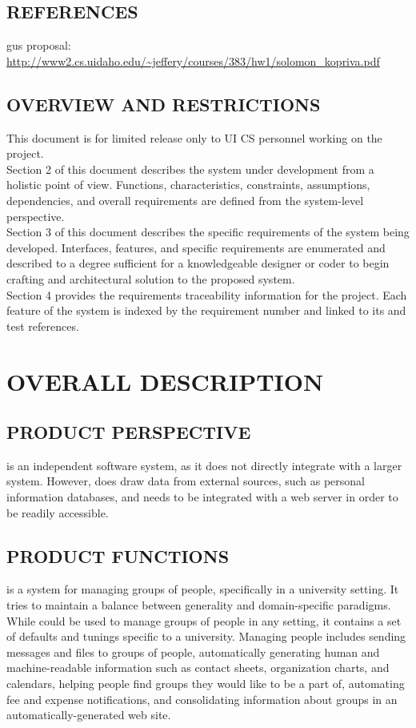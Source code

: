 \documentclass[12pt]{report}
\begin{document}
 \subsection{REFERENCES}
  gus proposal: {\small \url{http://www2.cs.uidaho.edu/~jeffery/courses/383/hw1/solomon_kopriva.pdf}}
 \newpage
 \subsection{OVERVIEW AND RESTRICTIONS}
  This document is for limited release only to UI CS personnel working on the project. \\[0.4cm]
  \indent Section 2 of this document describes the system under development from a holistic point of view. Functions, characteristics, constraints, assumptions, dependencies, and overall requirements are defined from the system-level perspective. \\[0.4cm]
  \indent Section 3 of this document describes the specific requirements of the system being developed. Interfaces, features, and specific requirements are enumerated and described to a degree sufficient for a knowledgeable designer or coder to begin crafting and architectural solution to the proposed system. \\[0.4cm]
  \indent Section 4 provides the requirements traceability information for the project. Each feature of the system is indexed by the  requirement number and linked to its  and test references.

\newpage
\section{OVERALL DESCRIPTION}
 \subsection{PRODUCT PERSPECTIVE}
   is an independent software system, as it does not directly integrate with a larger system. However,  does draw data from external sources, such as personal information databases, and needs to be integrated with a web server in order to be readily accessible.
 \subsection{PRODUCT FUNCTIONS}
   is a system for managing groups of people, specifically in a university setting. It tries to maintain a balance between generality and domain-specific paradigms. While  could be used to manage groups of people in any setting, it contains a set of defaults and tunings specific to a university.\newline
  \indent Managing people includes sending messages and files to groups of people, automatically generating human and machine-readable information such as contact sheets, organization charts, and calendars, helping people find groups they would like to be a part of, automating fee and expense notifications, and consolidating information about groups in an automatically-generated web site.
\end{document}
